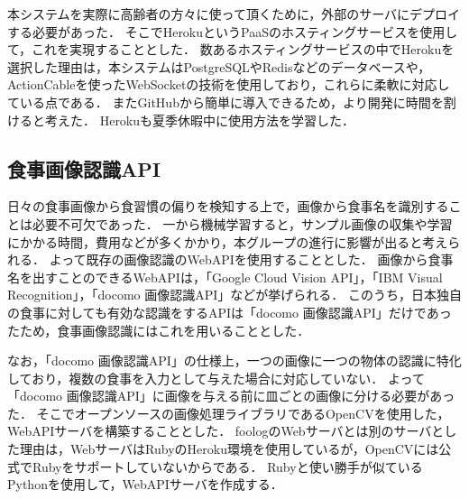 \documentclass[../report]{subfiles}
\begin{document}
本システムを実際に高齢者の方々に使って頂くために，外部のサーバにデプロイする必要があった．
そこでHerokuというPaaSのホスティングサービスを使用して，これを実現することとした．
数あるホスティングサービスの中でHerokuを選択した理由は，本システムはPostgreSQLやRedisなどのデータベースや，ActionCableを使ったWebSocketの技術を使用しており，これらに柔軟に対応している点である．
またGitHubから簡単に導入できるため，より開発に時間を割けると考えた．
Herokuも夏季休暇中に使用方法を学習した．


\subsection{食事画像認識API} \label{sec:3-food-recognition}
日々の食事画像から食習慣の偏りを検知する上で，画像から食事名を識別することは必要不可欠であった．
一から機械学習すると，サンプル画像の収集や学習にかかる時間，費用などが多くかかり，本グループの進行に影響が出ると考えられる．
よって既存の画像認識のWebAPIを使用することとした．
画像から食事名を出すことのできるWebAPIは，「Google Cloud Vision API」，「IBM Visual Recognition」，「docomo 画像認識API」などが挙げられる．
このうち，日本独自の食事に対しても有効な認識をするAPIは「docomo 画像認識API」だけであったため，食事画像認識にはこれを用いることとした．

なお，「docomo 画像認識API」の仕様上，一つの画像に一つの物体の認識に特化しており，複数の食事を入力として与えた場合に対応していない．
よって「docomo 画像認識API」に画像を与える前に皿ごとの画像に分ける必要があった．
そこでオープンソースの画像処理ライブラリであるOpenCVを使用した，WebAPIサーバを構築することとした．
foologのWebサーバとは別のサーバとした理由は，WebサーバはRubyのHeroku環境を使用しているが，OpenCVには公式でRubyをサポートしていないからである．
Rubyと使い勝手が似ているPythonを使用して，WebAPIサーバを作成する．
\end{document}
